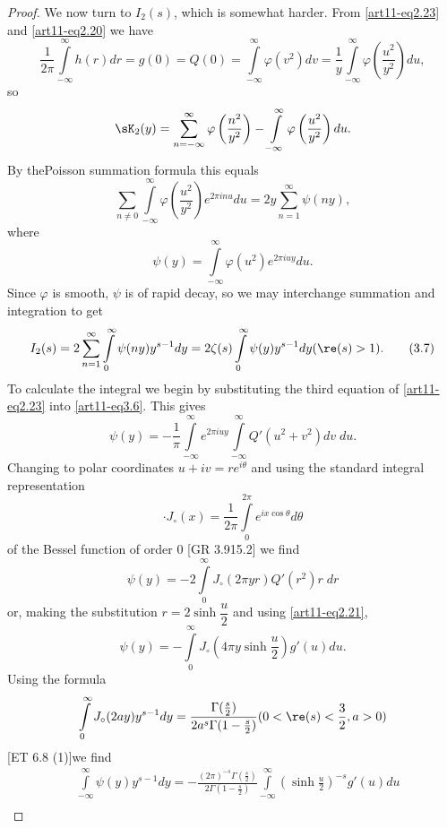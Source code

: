 \begin{proof}
We now turn to $I_2 (s)$, which is somewhat harder. From \eqref{art11-eq2.23} and \eqref{art11-eq2.20} we have 
$$
\frac{1}{2 \pi} \int\limits^\infty_{-\infty} h(r) dr = g (0) = Q(0) =\int\limits^\infty_{-\infty} \varphi (v^2) d v = \frac{1}{y} \int\limits^\infty_{-\infty} \varphi \left(\frac{u^2}{y^2} \right) du, 
$$
so
$$
\sK_2 (y) = \sum\limits^\infty_{n = - \infty} \varphi \left(\frac{n^2}{y^2} \right) - \int\limits^\infty_{-\infty} \varphi \left(\frac{u^2}{y^2} \right) du. 
$$
By the\pageoriginale  Poisson  summation formula this equals 
$$
\sum\limits_{n\neq 0} \int\limits^\infty_{-\infty} \varphi \left(\frac{u^2}{y^2} \right) e^{2 \pi in u} du = 2 y \sum\limits^\infty_{n=1} \psi (ny), 
$$
where 
\begin{equation*}
\psi (y) = \int\limits^\infty_{-\infty} \varphi (u^2) e^{2 \pi iu y} du. \tag{3.6}\label{art11-eq3.6}
\end{equation*}
Since $\varphi$ is smooth, $\psi$ is of rapid decay, so we may interchange summation and integration to get 
\begin{equation*}
I_2 (s) = 2 \sum\limits^\infty_{n=1} \int\limits^\infty_0 \psi (ny) y^{s-1} dy = 2 \zeta (s) \int\limits^\infty_0 \psi (y) y^{s-1} dy (\re (s) >1). \tag{3.7} \label{art11-eq3.7}
\end{equation*}
To calculate the integral we begin by substituting the third equation of \eqref{art11-eq2.23} into \eqref{art11-eq3.6}. This gives 
$$
\psi (y) = - \frac{1}{\pi} \int\limits^\infty_{-\infty} e^{2 \pi i u y} \int\limits^\infty_{-\infty} Q' (u^2 + v^2) d v \; du.
$$
Changing to polar coordinates $u+iv = re^{i \theta}$ and using the standard integral representation 
$$
\cdot J_\circ (x) =\frac{1}{2 \pi} \int\limits^{2 \pi}_0 e^{ix \cos \theta} d \theta
$$
of the Bessel function of order 0 [GR 3.915.2] we find 
$$
\psi (y) = -2 \int\limits^\infty_0 J_\circ (2 \pi y r) Q' (r^2) r \; dr 
$$
or, making the substitution $r =2 \sinh \dfrac{u}{2}$ and using \eqref{art11-eq2.21},
$$
\psi (y) = - \int\limits^\infty_0 J_\circ (4 \pi y \sinh \frac{u}{2}) g' (u) du. 
$$
Using the formula 
$$
\int\limits^\infty_{0} J_\circ (2 ay) y^{s-1} dy = \frac{\Gamma (\frac{s}{2})}{ 2a^s \Gamma (1 - \frac{s}{2})} (0 < \re (s) <\frac{3}{2}, a> 0)
$$
[ET 6.8 (1)]\pageoriginale we find
\begin{align*} 
& \int\limits^\infty_{-\infty} \psi (y) y^{s-1} dy =  - \frac{(2\pi)^{-s} \Gamma (\frac{s}{2})}{2 \Gamma (1-\frac{s}{2})} \int\limits^\infty_{-\infty} (\sinh \frac{u}{2})^{-s} g' (u) du \tag{3.8}\label{art11-eq3.8}\\

\end{align*}
\end{proof}
